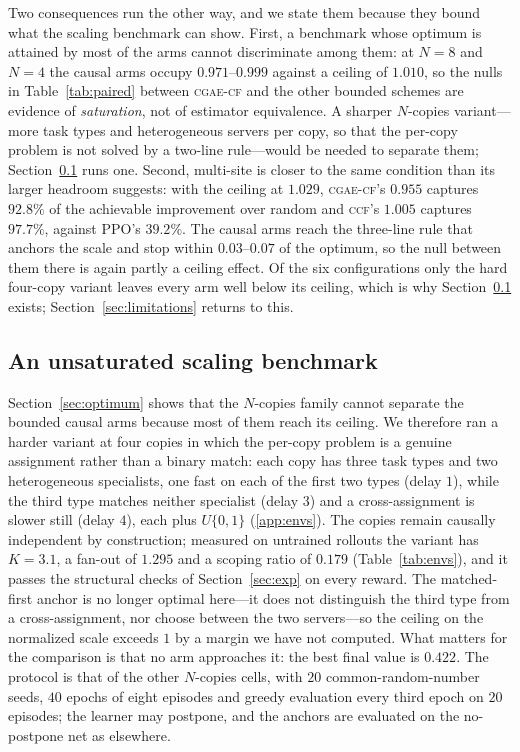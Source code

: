 \documentclass[review,authoryear,3p,times]{elsarticle}
\newcommand{\cflow}{\textsc{cgae-cf}}          %
\newcommand{\ccf}{\textsc{ccf}}
\begin{document}
Two consequences run the other way, and we state them because they bound what
the scaling benchmark can show. First, a benchmark whose optimum is attained by
most of the arms cannot discriminate among them: at $N{=}8$ and $N{=}4$ the
causal arms occupy $0.971$--$0.999$ against a ceiling of $1.010$, so the nulls
in Table~\ref{tab:paired} between \cflow{} and the other bounded schemes are
evidence of \emph{saturation}, not of estimator equivalence. A sharper
$N$-copies variant---more task types and heterogeneous servers per copy, so
that the per-copy problem is not solved by a two-line rule---would be needed to
separate them; Section~\ref{sec:hard} runs one. Second, multi-site is closer to
the same condition than its larger headroom suggests: with the ceiling at
$1.029$, \cflow's $0.955$ captures $92.8\%$ of the achievable improvement over
random and \ccf's $1.005$ captures $97.7\%$, against PPO's $39.2\%$. The
causal arms reach the three-line rule that anchors the scale and stop within
$0.03$--$0.07$ of the optimum, so the null between them there is again partly
a ceiling effect. Of the six configurations only the hard four-copy variant
leaves every arm well below its ceiling, which is why Section~\ref{sec:hard}
exists; Section~\ref{sec:limitations} returns to this.

\subsection{An unsaturated scaling benchmark}
\label{sec:hard}

Section~\ref{sec:optimum} shows that the $N$-copies family cannot separate the
bounded causal arms because most of them reach its ceiling. We therefore ran a
harder variant at four copies in which the per-copy problem is a genuine
assignment rather than a binary match: each copy has three task types and two
heterogeneous specialists, one fast on each of the first two types (delay $1$),
while the third type matches neither specialist (delay $3$) and a
cross-assignment is slower still (delay $4$), each plus $U\{0,1\}$
(\ref{app:envs}). The copies remain causally independent by
construction; measured on untrained rollouts the variant has $K=3.1$, a
fan-out of $1.295$ and a scoping ratio of $0.179$ (Table~\ref{tab:envs}), and
it passes the structural checks of Section~\ref{sec:exp} on every reward. The
matched-first anchor is no longer optimal here---it does not distinguish the
third type from a cross-assignment, nor choose between the two servers---so the
ceiling on the normalized scale exceeds $1$ by a margin we have not computed.
What matters for the comparison is that no arm approaches it: the best final
value is $0.422$. The protocol is that of the other $N$-copies cells, with $20$
common-random-number seeds, $40$ epochs of eight episodes and greedy evaluation
every third epoch on $20$ episodes; the learner may postpone, and the anchors
are evaluated on the no-postpone net as elsewhere.
\end{document}
